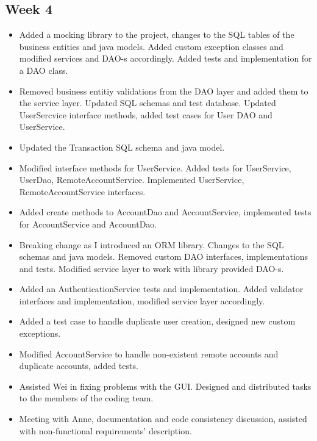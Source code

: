 \documentclass[12pt]{article}
\begin{document}
\subsection*{Week 4}
\begin{itemize}

\item Added a mocking library to the project, changes to the SQL tables of the business entities and java models. Added custom exception classes and modified services and DAO-s accordingly. Added tests and implementation for a DAO class. 

\item Removed business entitiy validations from the DAO layer and added them to the service layer. Updated SQL schemas and test database. Updated UserSercvice interface methods, added test cases for User DAO and UserService.

\item Updated the Transaction SQL schema and java model.

\item Modified interface methods for UserService. Added tests for UserService, UserDao, RemoteAccountService. Implemented UserService, RemoteAccountService interfaces. 

\item Added create methods to AccountDao and AccountService, implemented tests for AccountService and AccountDao. 

\item Breaking change as I introduced an ORM library. Changes to the SQL schemas and java models. Removed custom DAO interfaces, implementations and tests. Modified service layer to work with library provided DAO-s. 

\item Added an AuthenticationService tests and implementation. Added validator interfaces and implementation, modified service layer accordingly. 

\item Added a test case to handle duplicate user creation, designed new custom exceptions. 

\item Modified AccountService to handle non-existent remote accounts and duplicate accounts, added tests. 

\item Assisted Wei in fixing problems with the GUI. Designed and distributed tasks to the members of the coding team. 

\item Meeting with Anne, documentation and code consistency discussion, assisted with non-functional requirements' description.

\end{itemize}
\end{document}
